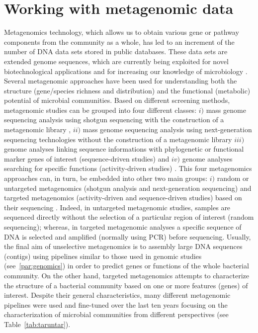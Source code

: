 \section{Working with metagenomic data}
Metagenomics technology, which allows us to obtain various gene or pathway components from the community as a whole, has led to an increment of the number of DNA data sets stored in public databases. These data sets are extended genome sequences, which are currently being exploited for novel biotechnological applications \cite{streit2004metagenomics} and for increasing our knowledge of microbiology \cite{tyson2004community}. Several metagenomic approaches have been used for understanding both the structure (gene/species richness and distribution) and the functional (metabolic) potential of microbial communities. Based on different screening methods, metagenomic studies can be grouped into four different classes: $i)$ mass genome sequencing analysis using shotgun sequencing with the construction of a metagenomic library \cite{chu2008identification}, $ii)$ mass genome sequencing analysis using next-generation sequencing technologies without the construction of a metagenomic library \cite{harismendy2009evaluation} $iii)$ genome analyses linking sequence informations with phylogenetic or functional marker genes of interest (sequence-driven studies) \cite{riesenfeld2004metagenomics} and $iv)$ genome analyses searching for specific functions (activity-driven studies) \cite{yun2005screening}. This four metagenomics approaches can, in turn, be embedded into other two main groups: $i)$ random or untargeted metagenomics (shotgun analysis and next-generation sequencing) and targeted metagenomics (activity-driven and sequence-driven studies) based on their sequencing \cite{suenaga2012targeted}. Indeed, in untargeted metagenomic studies, samples are sequenced directly without the selection of a particular region of interest (random sequencing); whereas, in targeted metagenomic analyses a specific sequence of DNA is selected and amplified (normally using PCR) before sequencing. Usually, the final aim of unselective metagenomics is to assembly large DNA sequences (contigs) using pipelines similar to those used in genomic studies (see~\ref{par:genomics}) in order to predict genes or functions of the whole bacterial community. On the other hand, targeted metagenomics attempts to characterize the structure of a bacterial community based on one or more features (genes) of interest. Despite their general characteristics, many different metagenomic pipelines were used and fine-tuned over the last ten years focusing on the characterization of microbial communities from different perspectives (see Table~\ref{tab:taruntar}).\\
